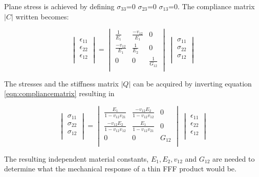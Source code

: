 Plane stress is achieved by defining $\sigma_{33}$=0 $\sigma_{23}$=0 $\sigma_{13}$=0. The compliance matrix $|C|$ written becomes:


\begin{equation}\label{eqn:compliancematrix}
\begin{vmatrix}
\epsilon_{11}\\
\epsilon_{22}\\
\epsilon_{12}\\
\end{vmatrix}
=
\begin{vmatrix}
\frac{1}{E_1} & \frac{-v_{12}}{E_1} & 0\\
\frac{-v_{12}}{E_1} & \frac{1}{E_2} & 0 \\
0 & 0 & \frac{1}{G_{12}}\\
\end{vmatrix}
\
\begin{vmatrix}
\sigma_{11}\\
\sigma_{22}\\
\sigma_{12}\\
\end{vmatrix}
\end{equation}

The stresses and the stiffness matrix $|Q|$ can be acquired by inverting equation \ref{eqn:compliancematrix} resulting in 

\begin{equation}\label{Stiffnesmatrix}
\begin{vmatrix}
\sigma_{11}\\
\sigma_{22}\\
\sigma_{12}\\
\end{vmatrix}
=
\begin{vmatrix}
\frac{E_1}{1-v_{12} v_{21}} & \frac{-v_{12}E_2}{1-v_{12}v_{12}} & 0\\
\frac{-v_{12}E_2}{1-v_{12}v_{12}} & \frac{E_1}{1-v_{12}v_{21}} & 0 \\
0 & 0 & G_{12}\\
\end{vmatrix}
\
\begin{vmatrix}
\epsilon_{11}\\
\epsilon_{22}\\
\epsilon_{12}\\
\end{vmatrix}
\end{equation}

The resulting independent material constants, $E_1, E_2, v_{12}$ and $G_{12}$ are needed to determine what the mechanical response of a thin FFF product would be.

